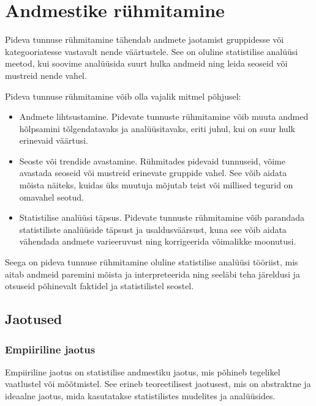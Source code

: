 \documentclass[
]{book}
\theoremstyle{definition}
\theoremstyle{definition}
\theoremstyle{definition}
\theoremstyle{definition}
\theoremstyle{remark}
\begin{document}
\chapter{Andmestike rühmitamine}\label{andmestike-ruxfchmitamine}

Pideva tunnuse rühmitamine tähendab andmete jaotamist gruppidesse või kategooriatesse vastavalt nende väärtustele. See on oluline statistilise analüüsi meetod, kui soovime analüüsida suurt hulka andmeid ning leida seoseid või mustreid nende vahel.

Pideva tunnuse rühmitamine võib olla vajalik mitmel põhjusel:

\begin{itemize}
\item
  Andmete lihtsustamine. Pidevate tunnuste rühmitamine võib muuta andmed hõlpsamini tõlgendatavaks ja analüüsitavaks, eriti juhul, kui on suur hulk erinevaid väärtusi.
\item
  Seoste või trendide avastamine. Rühmitades pidevaid tunnuseid, võime avastada seoseid või mustreid erinevate gruppide vahel. See võib aidata mõista näiteks, kuidas üks muutuja mõjutab teist või millised tegurid on omavahel seotud.
\item
  Statistilise analüüsi täpsus. Pidevate tunnuste rühmitamine võib parandada statistiliste analüüside täpsust ja usaldusväärsust, kuna see võib aidata vähendada andmete varieeruvust ning korrigeerida võimalikke moonutusi.
\end{itemize}

Seega on pideva tunnuse rühmitamine oluline statistilise analüüsi tööriist, mis aitab andmeid paremini mõista ja interpreteerida ning seeläbi teha järeldusi ja otsuseid põhinevalt faktidel ja statistilistel seostel.

\section{Jaotused}\label{jaotused}

\subsection{Empiiriline jaotus}\label{empiiriline-jaotus}

Empiiriline jaotus on statistilise andmestiku jaotus, mis põhineb tegelikel vaatlustel või mõõtmistel. See erineb teoreetilisest jaotusest, mis on abstraktne ja ideaalne jaotus, mida kasutatakse statistilistes mudelites ja analüüsides.
\end{document}
